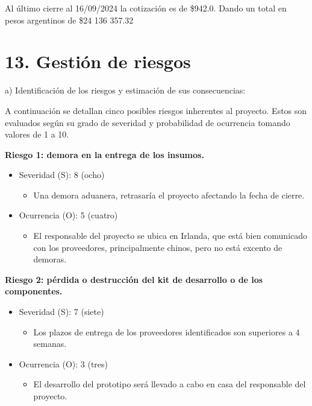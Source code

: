 \documentclass[
11pt, %
codirector, %
]{charter}
\begin{document}
Al último cierre al 16/09/2024 la cotización es de \$942.0. Dando un total en pesos argentinos de \$24 136 357.32

\section{13. Gestión de riesgos}
\label{sec:riesgos}

a) Identificación de los riesgos y estimación de sus consecuencias:

A continuación se detallan cinco posibles riesgos inherentes al proyecto. Estos son evaluados según su grado de severidad y probabilidad de ocurrencia tomando valores de 1 a 10.
 
\textbf{Riesgo 1: demora en la entrega de los insumos.}
\begin{itemize}
	\item Severidad (S): 8 (ocho)
		\begin{itemize}
			\item Una demora aduanera, retrasaría el proyecto afectando la fecha de cierre.
		\end{itemize}
	\item Ocurrencia (O): 5 (cuatro)
		\begin{itemize}
			\item El responsable del proyecto se ubica en Irlanda, que está bien comunicado con los proveedores, principalmente chinos, pero no está excento de demoras.
		\end{itemize}
\end{itemize}   

\textbf{Riesgo 2: pérdida o destrucción del kit de desarrollo o de los componentes.}
\begin{itemize}
	\item Severidad (S): 7 (siete)
		\begin{itemize}
			\item Los plazos de entrega de los proveedores identificados son superiores a 4 semanas.
		\end{itemize}
	\item Ocurrencia (O): 3 (tres)
		\begin{itemize}
			\item El desarrollo del prototipo será llevado a cabo en casa del responsable del proyecto.
		\end{itemize}
\end{itemize}
\end{document}
